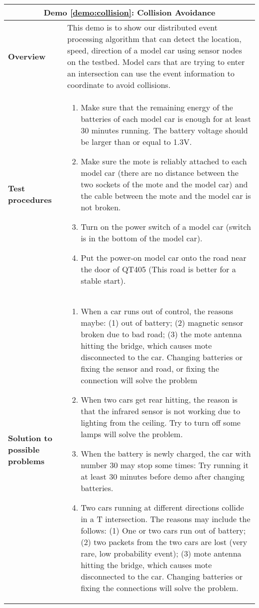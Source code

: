 \begin{center}
	\begin{tabular}{ | p{2cm} | p{10cm} | }
		\hline
		\multicolumn{2}{|c|}{\textbf{Demo \ref{demo:collision}: Collision Avoidance}} \\ \hline
		\textbf{Overview} &  This demo is to show our distributed event processing algorithm that can detect the location, speed, direction of a model car using sensor nodes on the testbed. Model cars that are trying to enter an intersection can use the event information to coordinate to avoid collisions. \\ \hline
		\textbf{Test procedures} &
		\begin{enumerate}
		\item Make sure that the remaining energy of the batteries of each model car is enough for at least 30 minutes running. The battery voltage should be larger than or equal to 1.3V.
		\item Make sure the mote is reliably attached to each model car (there are no distance between the two sockets of the mote and the model car) and the cable between the mote and the model car is not broken.
		\item Turn on the power switch of a model car (switch is in the bottom of the model car).
		\item Put the power-on model car onto the road near the door of QT405 (This road is better for a stable start).
		\end{enumerate} \\ \hline
		\textbf{Solution to possible problems} &
		\begin{enumerate}
		\item When a car runs out of control, the reasons maybe: (1) out of battery; (2) magnetic sensor broken due to bad road; (3) the mote antenna hitting the bridge, which causes mote disconnected to the car. Changing batteries or fixing the sensor and road, or fixing the connection will solve the problem
		\item When two cars get rear hitting, the reason is that the infrared sensor is not working due to lighting from the ceiling. Try to turn off some lamps will solve the problem.
		\item When the battery is newly charged, the car with number 30 may stop some times: Try running it at least 30 minutes before demo after changing batteries.
		\item Two cars running at different directions collide in a T intersection. The reasons may include the follows: (1) One or two cars run out of battery; (2) two packets from the two cars are lost (very rare, low probability event); (3) mote antenna hitting the bridge, which causes mote disconnected to the car. Changing batteries or fixing the connections will solve the problem.
		\end{enumerate}  \\
		\hline
	\end{tabular}
\end{center}

